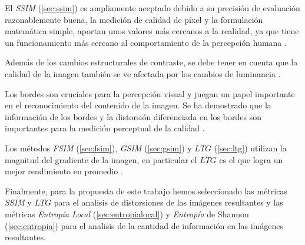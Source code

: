 El \textit{SSIM} (\ref{sec:ssim}) es ampliamente aceptado debido a su precisión de evaluación razonablemente buena, la medición de calidad de píxel y la formulación matemática simple, aportan unos valores más cercanos a la realidad, ya que tiene un funcionamiento más cercano al comportamiento de la percepción humana \cite{wang2009}.

Además de los cambios estructurales de contraste, se debe tener en cuenta que la calidad de la imagen también se ve afectada por los cambios de luminancia \cite{wang2009}.


Los bordes son cruciales para la percepción visual y juegan un papel importante en el reconocimiento del contenido de la imagen. Se ha demostrado que la información de los bordes y la distorsión diferenciada en los bordes son importantes para la medición perceptual de la calidad \cite{wang2009}. 

Los métodos \textit{FSIM} (\ref{sec:fsim}), \textit{GSIM} (\ref{sec:gsim}) y $LTG$ (\ref{sec:ltg}) utilizan la magnitud del gradiente de la imagen, en particular el $LTG$ es el que logra un mejor rendimiento en promedio \cite{ltg2014}.

Finalmente, para la propuesta de este trabajo hemos seleccionado las métricas \textit{SSIM} y $LTG$ para el analisis de distorsiones de las imágenes resultantes y las métricas \textit{Entropía Local} (\ref{sec:entropialocal}) y \textit{Entropía} de Shannon (\ref{sec:entropia}) para el analisis de la cantidad de información en las imágenes resultantes.

